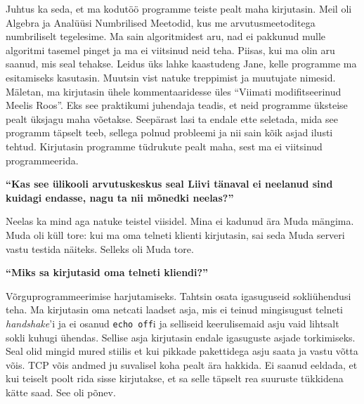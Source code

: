 Juhtus ka seda, et ma  kodutöö programme teiste pealt maha kirjutasin. Meil oli Algebra ja Analüüsi Numbrilised Meetodid, kus me arvutusmeetoditega numbriliselt tegelesime. Ma sain algoritmidest aru, nad ei pakkunud mulle algoritmi tasemel pinget ja ma ei viitsinud neid teha. Piisas, kui ma olin aru saanud, mis seal tehakse. Leidus üks lahke kaastudeng Jane, kelle programme ma esitamiseks kasutasin. Muutsin vist natuke treppimist ja muutujate nimesid. Mäletan, ma kirjutasin ühele kommentaaridesse üles \enquote{Viimati modifitseerinud Meelis Roos}. Eks see praktikumi juhendaja teadis, et neid programme üksteise pealt üksjagu maha võetakse. Seepärast lasi ta endale ette seletada, mida see programm täpselt teeb, sellega polnud probleemi ja nii sain kõik asjad ilusti tehtud. Kirjutasin programme tüdrukute pealt maha, sest ma ei viitsinud programmeerida. 

\textbf{\enquote{Kas see ülikooli arvutuskeskus seal Liivi tänaval ei neelanud sind kuidagi endasse, nagu ta nii mõnedki neelas?}} 

Neelas ka mind aga natuke teistel viisidel. Mina ei kadunud ära Muda mängima. Muda oli küll tore: kui ma oma telneti klienti kirjutasin, sai seda Muda serveri vastu testida näiteks. Selleks oli Muda tore. 

\textbf{\enquote{Miks sa kirjutasid oma telneti kliendi?}} 

Võrguprogrammeerimise harjutamiseks. Tahtsin osata igasuguseid sokliühendusi teha. Ma kirjutasin oma netcati laadset  asja, mis ei teinud mingisugust telneti \emph{handshake}'i  ja ei osanud \verb|echo off|i ja selliseid keerulisemaid asju vaid lihtsalt sokli kuhugi ühendas. Sellise asja kirjutasin endale igasuguste asjade torkimiseks. Seal olid mingid mured stiilis et kui pikkade pakettidega asju saata ja vastu võtta võis. TCP võis andmed ju suvalisel koha pealt ära hakkida. Ei saanud eeldada, et kui teiselt poolt rida sisse kirjutakse, et sa selle täpselt rea suuruste tükkidena kätte saad. See oli põnev.

